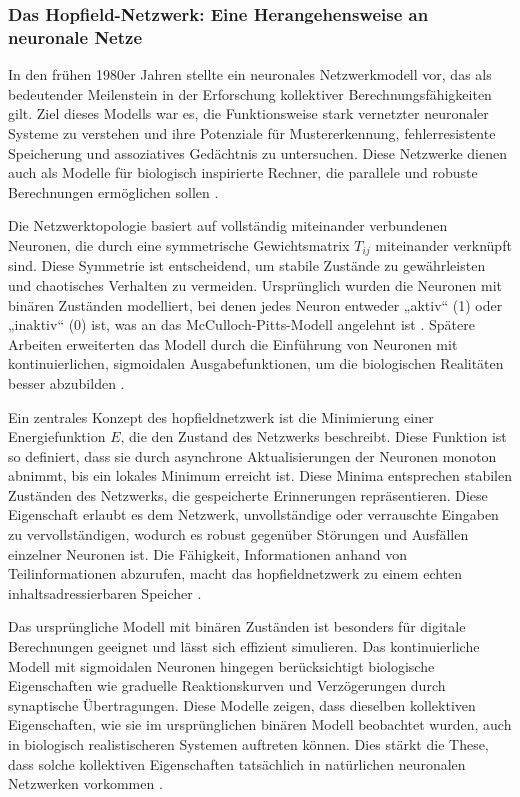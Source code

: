 \subsubsection{Das Hopfield-Netzwerk: Eine Herangehensweise an neuronale Netze}

In den frühen 1980er Jahren stellte \citeauthor{Hopfield1982} ein neuronales Netzwerkmodell vor, das als bedeutender Meilenstein in der Erforschung kollektiver Berechnungsfähigkeiten gilt. Ziel dieses Modells war es, die Funktionsweise stark vernetzter neuronaler Systeme zu verstehen und ihre Potenziale für Mustererkennung, fehlerresistente Speicherung und assoziatives Gedächtnis zu untersuchen. Diese Netzwerke dienen auch als Modelle für biologisch inspirierte Rechner, die parallele und robuste Berechnungen ermöglichen sollen \cite[vgl. S. 2554]{Hopfield1982} \cite[vgl. S. 3088]{Hopfield1984}.

Die Netzwerktopologie basiert auf vollständig miteinander verbundenen Neuronen, die durch eine symmetrische Gewichtsmatrix \(T_{ij}\) miteinander verknüpft sind. Diese Symmetrie ist entscheidend, um stabile Zustände zu gewährleisten und chaotisches Verhalten zu vermeiden. Ursprünglich wurden die Neuronen mit binären Zuständen modelliert, bei denen jedes Neuron entweder „aktiv“ (1) oder „inaktiv“ (0) ist, was an das McCulloch-Pitts-Modell angelehnt ist \cite[vgl. S. 2555]{Hopfield1982}. Spätere Arbeiten erweiterten das Modell durch die Einführung von Neuronen mit kontinuierlichen, sigmoidalen Ausgabefunktionen, um die biologischen Realitäten besser abzubilden \cite[vgl. S. 3088]{Hopfield1984}.

Ein zentrales Konzept des \gls{hopfieldnetzwerk} ist die Minimierung einer Energiefunktion \(E\), die den Zustand des Netzwerks beschreibt. Diese Funktion ist so definiert, dass sie durch asynchrone Aktualisierungen der Neuronen monoton abnimmt, bis ein lokales Minimum erreicht ist. Diese Minima entsprechen stabilen Zuständen des Netzwerks, die gespeicherte Erinnerungen repräsentieren. Diese Eigenschaft erlaubt es dem Netzwerk, unvollständige oder verrauschte Eingaben zu vervollständigen, wodurch es robust gegenüber Störungen und Ausfällen einzelner Neuronen ist. Die Fähigkeit, Informationen anhand von Teilinformationen abzurufen, macht das \gls{hopfieldnetzwerk} zu einem echten inhaltsadressierbaren Speicher \cite[vgl. S. 2554 f.]{Hopfield1982}.

Das ursprüngliche Modell mit binären Zuständen ist besonders für digitale Berechnungen geeignet und lässt sich effizient simulieren. Das kontinuierliche Modell mit sigmoidalen Neuronen hingegen berücksichtigt biologische Eigenschaften wie graduelle Reaktionskurven und Verzögerungen durch synaptische Übertragungen. Diese Modelle zeigen, dass dieselben kollektiven Eigenschaften, wie sie im ursprünglichen binären Modell beobachtet wurden, auch in biologisch realistischeren Systemen auftreten können. Dies stärkt die These, dass solche kollektiven Eigenschaften tatsächlich in natürlichen neuronalen Netzwerken vorkommen \cite[vgl. S. 3089]{Hopfield1984}.

